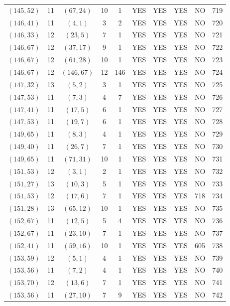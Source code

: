 \begin{longtable}{|c|c|c|c|c|c|c|c|c|c|}
$(145, 52)$ & 11 & $(67, 24)$ & 10 & 1 & YES & YES & YES & NO & 719\\
$(146, 41)$ & 11 & $(4, 1)$ & 3 & 2 & YES & YES & YES & NO & 720\\
$(146, 33)$ & 12 & $(23, 5)$ & 7 & 1 & YES & YES & YES & NO & 721\\
$(146, 67)$ & 12 & $(37, 17)$ & 9 & 1 & YES & YES & YES & NO & 722\\
$(146, 67)$ & 12 & $(61, 28)$ & 10 & 1 & YES & YES & YES & NO & 723\\
$(146, 67)$ & 12 & $(146, 67)$ & 12 & 146 & YES & YES & YES & NO & 724\\
$(147, 32)$ & 13 & $(5, 2)$ & 3 & 1 & YES & YES & YES & NO & 725\\
$(147, 53)$ & 11 & $(7, 3)$ & 4 & 7 & YES & YES & YES & NO & 726\\
$(147, 41)$ & 11 & $(17, 5)$ & 6 & 1 & YES & YES & YES & NO & 727\\
$(147, 53)$ & 11 & $(19, 7)$ & 6 & 1 & YES & YES & YES & NO & 728\\
$(149, 65)$ & 11 & $(8, 3)$ & 4 & 1 & YES & YES & YES & NO & 729\\
$(149, 40)$ & 11 & $(26, 7)$ & 7 & 1 & YES & YES & YES & NO & 730\\
$(149, 65)$ & 11 & $(71, 31)$ & 10 & 1 & YES & YES & YES & NO & 731\\
$(151, 53)$ & 12 & $(3, 1)$ & 2 & 1 & YES & YES & YES & NO & 732\\
$(151, 27)$ & 13 & $(10, 3)$ & 5 & 1 & YES & YES & YES & NO & 733\\
$(151, 53)$ & 12 & $(17, 6)$ & 7 & 1 & YES & YES & YES & 718 & 734\\
$(151, 28)$ & 13 & $(65, 12)$ & 10 & 1 & YES & YES & YES & NO & 735\\
$(152, 67)$ & 11 & $(12, 5)$ & 5 & 4 & YES & YES & YES & NO & 736\\
$(152, 67)$ & 11 & $(23, 10)$ & 7 & 1 & YES & YES & YES & NO & 737\\
$(152, 41)$ & 11 & $(59, 16)$ & 10 & 1 & YES & YES & YES & 605 & 738\\
$(153, 59)$ & 12 & $(5, 1)$ & 4 & 1 & YES & YES & YES & NO & 739\\
$(153, 56)$ & 11 & $(7, 2)$ & 4 & 1 & YES & YES & YES & NO & 740\\
$(153, 70)$ & 12 & $(13, 6)$ & 7 & 1 & YES & YES & YES & NO & 741\\
$(153, 56)$ & 11 & $(27, 10)$ & 7 & 9 & YES & YES & YES & NO & 742\\

\end{longtable}
